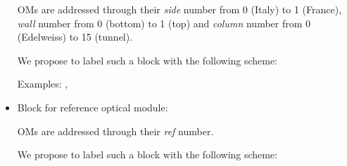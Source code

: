 \begin{itemize}
  \par   OMs  are   addressed  through   their
  \emph{side}   number from 0 (Italy)     to  1 (France),
  \emph{wall}   number from 0 (bottom)    to  1 (top)  and
  \emph{column} number from 0 (Edelweiss) to 15 (tunnel).
  
  \par We propose to label  such a block
  with the following scheme:
  \begin{center}
  \end{center}
  \vskip 10pt
  
  \par\noindent Examples: , 
  
\item  Block for  reference  optical module:
  
  \par  OMs are  addressed  through their \emph{ref}  number.
  
  \par We propose to  label such a  block with the following scheme:
  \begin{center}
  \end{center}

\end{itemize}
